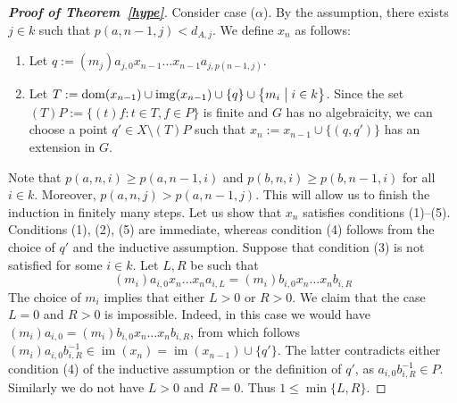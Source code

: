 \documentclass[11pt]{amsart}
\makeatletter
\theoremstyle{definition}
\newcommand{\im}{\operatorname{im}}
\newcommand{\dom}{\operatorname{dom}}
\newcommand{\makeset}[2]{\left\lbrace #1 \;\middle|\;
 \begin{tabular}{@{}l@{}}
   #2
  \end{tabular}
  \right\rbrace}
\makeatother
\begin{document}
\begin{proof}[{\bf Proof of Theorem~\ref{hype}}]
Consider case ($\alpha$). By the assumption, there exists $j\in k$ such that $p(a,n-1,j)<d_{A,j}$. We define \(x_n\) as follows:
\begin{enumerate}[\rm(a)]
    \item Let \(q := (m_j)a_{j, 0}x_{n-1}\ldots x_{n-1} a_{j, p(n-1,j)}\).
    \item Let $T:=\operatorname{dom}(x_{n-1}) \cup \operatorname{img}(x_{n-1}) \cup \{q\}\cup \makeset{m_i}{\(i\in k\)}$. Since the set $(T)P:=\{(t)f: t\in T, f\in P\}$ is finite and \(G\) has no algebraicity, we can choose a point \(q'\in X\setminus (T)P\) such that \(x_n := x_{n-1} \cup \{(q, q')\}\) has an extension in \(G\).
\end{enumerate}
Note that $p(a,n,i)\geq p(a, n-1,i)$ and $p(b,n,i)\geq p(b, n-1,i)$ for all $i\in k$. Moreover, $p(a,n,j)>p(a,n-1,j)$. This will allow us to finish the induction in finitely many steps.
Let us show that \(x_n\) satisfies conditions (1)--(5).
Conditions (1), (2), (5) are immediate, whereas condition (4) follows from the choice of $q'$ and the inductive assumption. Suppose that condition (3) is not satisfied for some \(i\in k\). Let \(L, R\) be such that 
\begin{equation}\label{not3}\tag{$\ast$}
(m_i)a_{i, 0}x_{n} \ldots x_{n} a_{i, L}= (m_i)b_{i, 0}x_{n} \ldots x_{n} b_{i, R}
\end{equation}
The choice of \(m_{i}\) implies that either \(L>0\) or \(R>0\). We claim that the case \(L=0\) and \(R>0\) is impossible. Indeed, in this case we would have $(m_i)a_{i, 0}= (m_i)b_{i, 0}x_{n} \ldots x_{n} b_{i, R}$, from which follows \((m_i)a_{i, 0}b_{i, R}^{-1}\in \im(x_n)=\im(x_{n-1})\cup \{q'\}\). The latter contradicts either condition (4) of the inductive assumption or the definition of \(q'\), as $a_{i, 0}b_{i, R}^{-1}\in P$. 
Similarly we do not have \(L>0\) and \(R=0\). Thus \(1\leq \min\{L, R\}\).



\end{proof}
\end{document}
